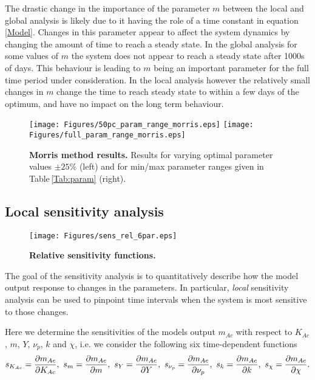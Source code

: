 \documentclass[a4paper, 12pt]{article}
\begin{document}
\smallskip

The drastic change in the importance of the parameter $m$ between the local and global analysis is likely due to it having the role of a time constant in equation \eqref{Model}. Changes in this parameter appear to affect the system dynamics by changing the amount of time to reach a steady state. In the global analysis for some values of $m$ the system does not appear to reach a steady state after 1000s of days. This behaviour is leading to $m$ being an important parameter for the full time period under consideration. In the local analysis however the relatively small changes in $m$ change the time to reach steady state to within a few days of the optimum, and have no impact on the long term behaviour.

\begin{figure}
\begin{center}
\texttt{[image: Figures/50pc\_param\_range\_morris.eps]}
\texttt{[image: Figures/full\_param\_range\_morris.eps]}
\caption{{\bf Morris method results.} Results for varying optimal parameter values $\pm 25\%$ (left) and for min/max parameter ranges given in Table\,\ref{Tab:param} (right).}
\label{fig:morrisfull}
\end{center}
\end{figure}

\subsection{Local sensitivity analysis}

\begin{figure}[t]
\begin{center}
\texttt{[image: Figures/sens\_rel\_6par.eps]}
\caption{{\bf Relative sensitivity functions.}}\label{Fig:sens}
\end{center}
\end{figure}

The goal of the sensitivity analysis is to quantitatively describe how the model output response to changes in the parameters. In particular, \emph{local} sensitivity analysis can be used to pinpoint time intervals when the system is most sensitive to those changes. 

\smallskip

Here we  determine the sensitivities of the models output $m_{Ac}$ with respect to $K_{Ac}$, $m$,  $Y$, $\nu_p$, $k$ and $\chi$, i.e. we consider the following six time-dependent functions 
{\footnotesize
\begin{equation}\label{Res:sens}
s_{K_{Ac}} = \frac{\partial m_{Ac}}{\partial K_{Ac}},\,\,  s_{m}=  \frac{\partial m_{Ac}}{\partial m},\,\, s_{Y}= \dfrac{\partial m_{Ac}}{\partial Y},\,\,  s_{\nu_p}= \dfrac{\partial m_{Ac}}{\partial \nu_p},\,\,  s_{k}= \dfrac{\partial m_{Ac}}{\partial k},\,\,  s_{\chi}= \dfrac{\partial m_{Ac}}{\partial \chi}.
\end{equation}
}
\end{document}
